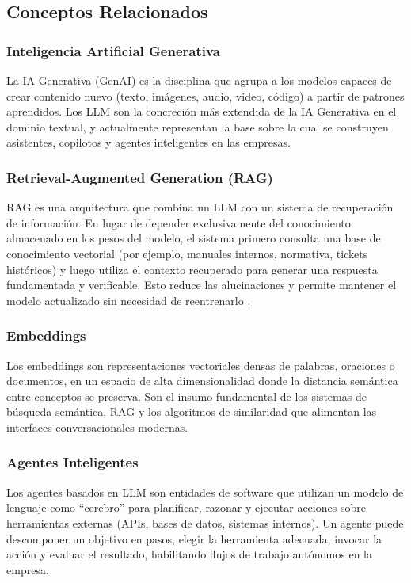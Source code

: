 \documentclass[12pt,a4paper,oneside]{article}
\begin{document}
\subsection{Conceptos Relacionados}

\subsubsection{Inteligencia Artificial Generativa}

La IA Generativa (GenAI) es la disciplina que agrupa a los modelos capaces de crear contenido nuevo (texto, imágenes, audio, video, código) a partir de patrones aprendidos. Los LLM son la concreción más extendida de la IA Generativa en el dominio textual, y actualmente representan la base sobre la cual se construyen asistentes, copilotos y agentes inteligentes en las empresas.

\subsubsection{Retrieval-Augmented Generation (RAG)}

RAG es una arquitectura que combina un LLM con un sistema de recuperación de información. En lugar de depender exclusivamente del conocimiento almacenado en los pesos del modelo, el sistema primero consulta una base de conocimiento vectorial (por ejemplo, manuales internos, normativa, tickets históricos) y luego utiliza el contexto recuperado para generar una respuesta fundamentada y verificable. Esto reduce las alucinaciones y permite mantener el modelo actualizado sin necesidad de reentrenarlo \cite{nistGenAI2024}.

\subsubsection{Embeddings}

Los embeddings son representaciones vectoriales densas de palabras, oraciones o documentos, en un espacio de alta dimensionalidad donde la distancia semántica entre conceptos se preserva. Son el insumo fundamental de los sistemas de búsqueda semántica, RAG y los algoritmos de similaridad que alimentan las interfaces conversacionales modernas.

\subsubsection{Agentes Inteligentes}

Los agentes basados en LLM son entidades de software que utilizan un modelo de lenguaje como ``cerebro'' para planificar, razonar y ejecutar acciones sobre herramientas externas (APIs, bases de datos, sistemas internos). Un agente puede descomponer un objetivo en pasos, elegir la herramienta adecuada, invocar la acción y evaluar el resultado, habilitando flujos de trabajo autónomos en la empresa.
\end{document}
